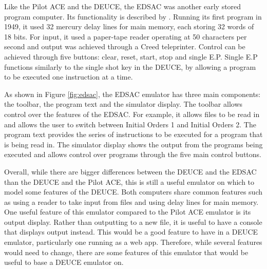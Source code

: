 \documentclass{l4proj}
\begin{document}
Like the Pilot ACE and the DEUCE, the EDSAC was another early stored program computer. Its functionality is described by \citet{Edsac11}. Running its first program in 1949, it used 32 mercury delay lines for main memory, each storing 32 words of 18 bits. For input, it used a paper-tape reader operating at 50 characters per second and output was achieved through a Creed teleprinter. Control can be achieved through five buttons: clear, reset, start, stop and single E.P. Single E.P functions similarly to the single shot key in the DEUCE, by allowing a program to be executed one instruction at a time. 

As shown in Figure \ref{fig:edsac}, the EDSAC emulator has three main components: the toolbar, the program text and the simulator display. The toolbar allows control over the features of the EDSAC. For example, it allows files to be read in and allows the user to switch between Initial Orders 1 and Initial Orders 2. The program text provides the series of instructions to be executed for a program that is being read in. The simulator display shows the output from the programs being executed and allows control over programs through the five main control buttons.

Overall, while there are bigger differences between the DEUCE and the EDSAC than the DEUCE and the Pilot ACE, this is still a useful emulator on which to model some features of the DEUCE. Both computers share common features such as using a reader to take input from files and using delay lines for main memory. One useful feature of this emulator compared to the Pilot ACE emulator is its output display. Rather than outputting to a new file, it is useful to have a console that displays output instead. This would be a good feature to have in a DEUCE emulator, particularly one running as a web app. Therefore, while several features would need to change, there are some features of this emulator that would be useful to base a DEUCE emulator on.
\end{document}
